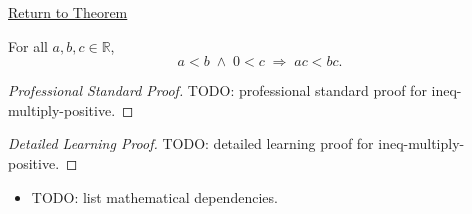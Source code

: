 \newpage
{}
\label{prf:ineq-multiply-positive}

\begin{remark*}[Return]
\hyperref[thm:ineq-multiply-positive]{Return to Theorem}
\end{remark*}

\begin{theorem*}
For all $a, b, c \in \mathbb{R}$,
\[
  a < b \;\land\; 0 < c \;\Rightarrow\; ac < bc.
\]
\end{theorem*}

\begin{proof}[Professional Standard Proof]
\LRAProofBodyStart
TODO: professional standard proof for ineq-multiply-positive.
\end{proof}

\begin{proof}[Detailed Learning Proof]
\LRAProofBodyStart
TODO: detailed learning proof for ineq-multiply-positive.
\end{proof}

\begin{remark*}
\end{remark*}

\begin{dependencies}
\begin{itemize}
  \item TODO: list mathematical dependencies.
\end{itemize}
\end{dependencies}

\clearpage
